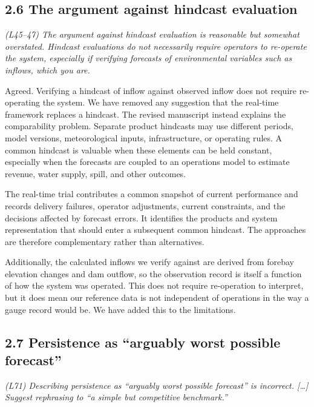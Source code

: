 \documentclass[11pt]{article}
\newenvironment{rc}%
  {\begin{list}{}{\setlength{\leftmargin}{1.5em}\setlength{\rightmargin}{1.5em}%
   \setlength{\topsep}{0.2em}\setlength{\parsep}{0pt}\setlength{\itemsep}{0pt}}%
   \item[]\itshape\color{quotegray}}%
  {\end{list}}
\begin{document}
\subsection*{2.6 The argument against hindcast evaluation}

\begin{rc}
(L45--47) The argument against hindcast evaluation is reasonable but somewhat
overstated. Hindcast evaluations do not necessarily require operators to re-operate
the system, especially if verifying forecasts of environmental variables such as
inflows, which you are.
\end{rc}

Agreed. Verifying a hindcast of inflow against observed inflow does not require re-operating the
system. We have removed any suggestion that the real-time framework replaces a hindcast. The
revised manuscript instead explains the comparability problem. Separate product hindcasts may use
different periods, model versions, meteorological inputs, infrastructure, or operating rules. A
common hindcast is valuable when these elements can be held constant, especially when the forecasts
are coupled to an operations model to estimate revenue, water supply, spill, and other outcomes.

The real-time trial contributes a common snapshot of current performance and records delivery
failures, operator adjustments, current constraints, and the decisions affected by forecast errors.
It identifies the products and system representation that should enter a subsequent common
hindcast. The approaches are therefore complementary rather than alternatives.

Additionally, the calculated inflows we
verify against are derived from forebay elevation changes and dam outflow, so the observation record
is itself a function of how the system was operated. This does not require re-operation to
interpret, but it does mean our reference data is not independent of operations in the way a gauge
record would be. We have added this to the limitations.

\subsection*{2.7 Persistence as ``arguably worst possible forecast''}

\begin{rc}
(L71) Describing persistence as ``arguably worst possible forecast'' is incorrect.
[\ldots] Suggest rephrasing to ``a simple but competitive benchmark.''
\end{rc}
\end{document}
